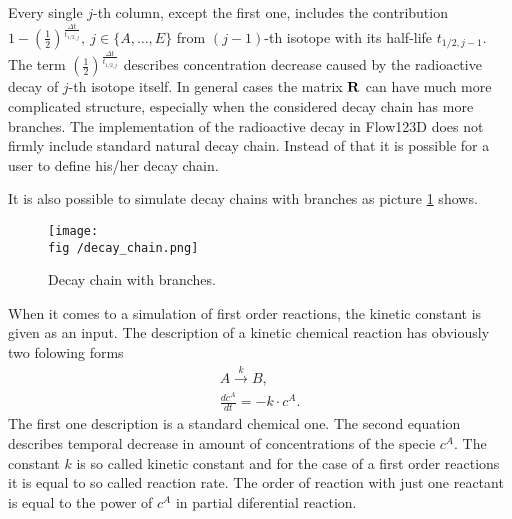 Every single $j$-th column, except the first one, includes the contribution $1 - \left(\frac{1}{2}\right)^\frac{\Delta t}{t_{1/2,j}},~j\in\{A,\ldots, E\}$ from $(j-1)$-th
isotope with its half-life $t_{1/2,j-1}$. The term $\left(\frac{1}{2}\right)^\frac{\Delta t}{t_{1/2,j}}$ describes concentration decrease caused by the radioactive decay of $j$-th isotope itself. In general cases the matrix ${\bf R}$ can have much more complicated structure, especially when the considered decay chain has more branches.
The implementation of the radioactive decay in Flow123D does not firmly include standard natural decay chain. Instead of that it is possible for a user to define his/her decay chain.

It is also possible to simulate decay chains with branches as picture \ref{pic:dec_branches} shows.

\begin{figure}[htb]
 \centering
 \texttt{[image: \\fig /decay\_chain.png]}
 \caption{Decay chain with branches.}
 \label{pic:dec_branches}
\end{figure}


When it comes to a simulation of first order reactions, the kinetic constant is given as an input. 
The description of a kinetic chemical reaction has obviously two folowing forms
\[
  \begin{array}{l}
    A\xrightarrow{k}B,\\
    \frac{dc^A}{dt} = -k \cdot c^A.
  \end{array}
\]
The first one description is a standard chemical one. The second equation describes temporal decrease in amount of concentrations of the specie $c^A$. The constant $k$ is so called kinetic constant and for the case of a first order reactions it is equal to so called reaction rate. The order of reaction with just one reactant is equal to the power of $c^A$ in partial diferential reaction.

